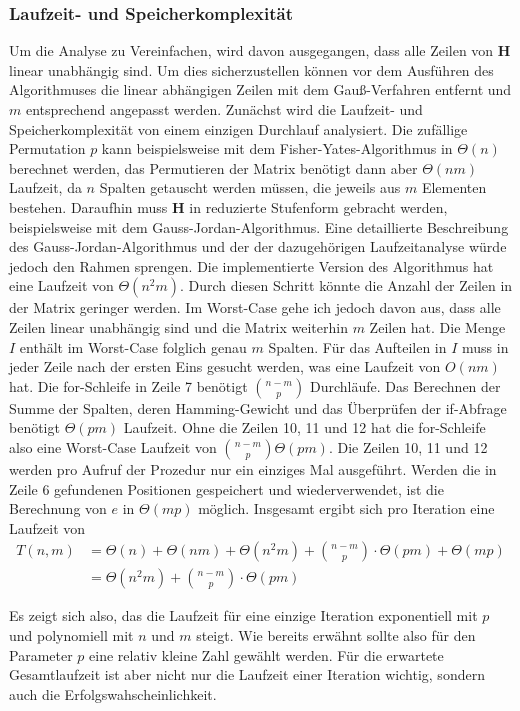 \documentclass[a4paper,10pt,ngerman]{scrartcl}
\begin{document}
\subsubsection{Laufzeit- und Speicherkomplexität}
\label{sec:runtime}
Um die Analyse zu Vereinfachen, wird davon ausgegangen, dass alle Zeilen von $\mathbf{H}$ linear unabhängig sind. Um dies sicherzustellen können vor dem Ausführen des Algorithmuses die linear abhängigen Zeilen mit dem Gauß-Verfahren entfernt und $m$ entsprechend angepasst werden. 
Zunächst wird die Laufzeit- und Speicherkomplexität von einem einzigen Durchlauf analysiert. 
Die zufällige Permutation $p$ kann beispielsweise mit dem Fisher-Yates-Algorithmus in $\Theta(n)$ berechnet werden, das Permutieren der Matrix benötigt dann aber $\Theta(nm)$ Laufzeit, da $n$ Spalten getauscht werden müssen, die jeweils aus $m$ Elementen bestehen.
Daraufhin muss $\mathbf{H}$ in reduzierte Stufenform gebracht werden, beispielsweise mit dem Gauss-Jordan-Algorithmus. 
Eine detaillierte Beschreibung des Gauss-Jordan-Algorithmus und der der dazugehörigen Laufzeitanalyse würde jedoch den Rahmen sprengen.
Die implementierte Version des Algorithmus hat eine Laufzeit von $\Theta(n^2m)$.
Durch diesen Schritt könnte die Anzahl der Zeilen in der Matrix geringer werden. 
Im Worst-Case gehe ich jedoch davon aus, dass alle Zeilen linear unabhängig sind und die Matrix weiterhin $m$ Zeilen hat. 
Die Menge $I$ enthält im Worst-Case folglich genau $m$ Spalten.
Für das Aufteilen in $I$ muss in jeder Zeile nach der ersten Eins gesucht werden, was eine Laufzeit von $O(nm)$ hat.
Die for-Schleife in Zeile 7 benötigt $\binom{n-m}{p}$ Durchläufe.
Das Berechnen der Summe der Spalten, deren Hamming-Gewicht und das Überprüfen der if-Abfrage benötigt $\Theta(pm)$ Laufzeit. 
Ohne die Zeilen 10, 11 und 12 hat die for-Schleife also eine Worst-Case Laufzeit von $\binom{n-m}{p}\Theta(pm)$.
Die Zeilen 10, 11 und 12 werden pro Aufruf der Prozedur nur ein einziges Mal ausgeführt. Werden die in Zeile 6 gefundenen Positionen gespeichert und wiederverwendet, ist die Berechnung von $e$ in $\Theta(mp)$ möglich. 
Insgesamt ergibt sich pro Iteration eine Laufzeit von 
\begin{align*}
    T(n, m) &= \Theta(n) + \Theta(nm) + \Theta(n^2m) + \binom{n-m}{p} \cdot \Theta(pm) + \Theta(mp)\\
            &= \Theta(n^2m) + \binom{n-m}{p}\cdot \Theta(pm)
\end{align*}

Es zeigt sich also, das die Laufzeit für eine einzige Iteration exponentiell mit $p$ und polynomiell mit $n$ und $m$ steigt. Wie bereits erwähnt sollte also für den Parameter $p$ eine relativ kleine Zahl gewählt werden.
Für die erwartete Gesamtlaufzeit ist aber nicht nur die Laufzeit einer Iteration wichtig, sondern auch die Erfolgswahscheinlichkeit.
\end{document}
